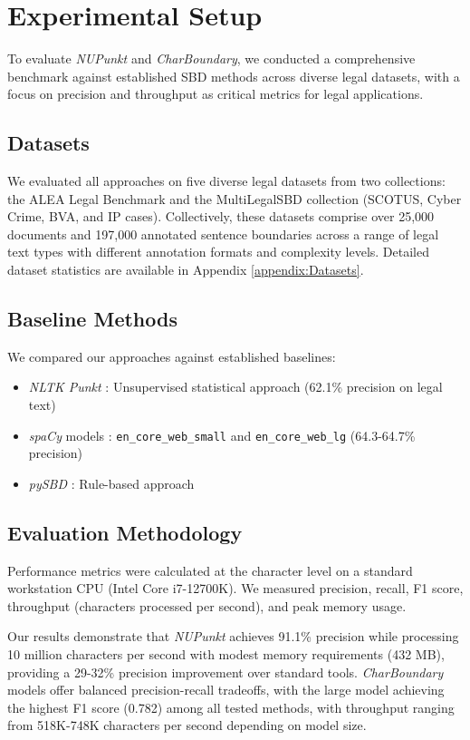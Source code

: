 \section{Experimental Setup}
To evaluate \textit{NUPunkt} and \textit{CharBoundary}, we conducted a comprehensive benchmark against established SBD methods across diverse legal datasets, with a focus on precision and throughput as critical metrics for legal applications.

\subsection{Datasets}
We evaluated all approaches on five diverse legal datasets from two collections: the ALEA Legal Benchmark \cite{alea-benchmark} and the MultiLegalSBD collection \cite{multilegalSBD} (SCOTUS, Cyber Crime, BVA, and IP cases). Collectively, these datasets comprise over 25,000 documents and 197,000 annotated sentence boundaries across a range of legal text types with different annotation formats and complexity levels. Detailed dataset statistics are available in Appendix \ref{appendix:Datasets}.

\subsection{Baseline Methods}
We compared our approaches against established baselines:
\begin{itemize}
    \item \textit{NLTK Punkt} \cite{kiss2006unsupervised}: Unsupervised statistical approach (62.1\% precision on legal text)
    \item \textit{spaCy} models \cite{spacy}: \texttt{en\_core\_web\_small} and \texttt{en\_core\_web\_lg} (64.3-64.7\% precision)
    \item \textit{pySBD} \cite{sadvilkar2020pysbd}: Rule-based approach
\end{itemize}

\subsection{Evaluation Methodology}
Performance metrics were calculated at the character level on a standard workstation CPU (Intel Core i7-12700K). We measured precision, recall, F1 score, throughput (characters processed per second), and peak memory usage.

Our results demonstrate that \textit{NUPunkt} achieves 91.1\% precision while processing 10 million characters per second with modest memory requirements (432 MB), providing a 29-32\% precision improvement over standard tools. \textit{CharBoundary} models offer balanced precision-recall tradeoffs, with the large model achieving the highest F1 score (0.782) among all tested methods, with throughput ranging from 518K-748K characters per second depending on model size.

